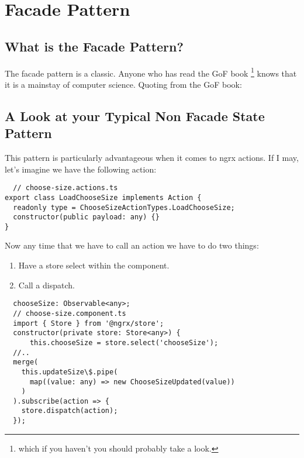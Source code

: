 \maketitle{}
\section{ Facade Pattern }

\subsection{ What is the Facade Pattern? }
The facade pattern is a classic. Anyone who has read the GoF book \footnote{
which if you haven't you should probably take a look.} knows that it is a
mainstay of computer science. Quoting from the GoF book:


\subsection{ A Look at your Typical Non Facade State Pattern  }
This pattern is particularly advantageous when it comes to ngrx actions. If I
may, let's imagine we have the following action:

\begin{lstlisting}
  // choose-size.actions.ts
export class LoadChooseSize implements Action {
  readonly type = ChooseSizeActionTypes.LoadChooseSize;
  constructor(public payload: any) {}
}
\end{lstlisting}

Now any time that we have to call an action we have to do two things:
\begin{enumerate}
  \item Have a store select within the component.
  \item Call a dispatch.
\end{enumerate}

\begin{lstlisting}
  chooseSize: Observable<any>;
  // choose-size.component.ts
  import { Store } from '@ngrx/store';
  constructor(private store: Store<any>) {
      this.chooseSize = store.select('chooseSize');
  //..
  merge(
    this.updateSize\$.pipe(
      map((value: any) => new ChooseSizeUpdated(value))
    )
  ).subscribe(action => {
    store.dispatch(action);
  });
\end{lstlisting}

